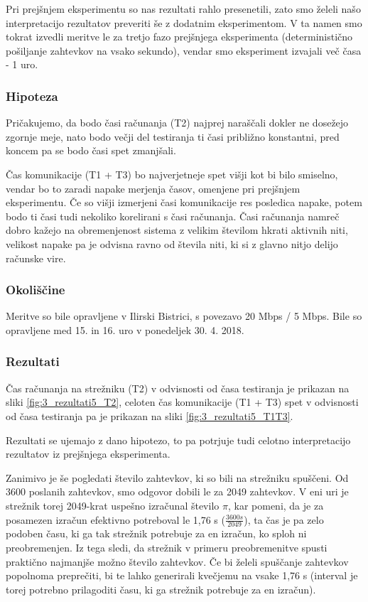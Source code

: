 Pri prejšnjem eksperimentu so nas rezultati rahlo presenetili, zato smo želeli našo interpretacijo rezultatov preveriti še z dodatnim eksperimentom.
V ta namen smo tokrat izvedli meritve le za tretjo fazo prejšnjega eksperimenta (deterministično pošiljanje zahtevkov na vsako sekundo), vendar smo eksperiment izvajali več časa - 1 uro.

\subsubsection{Hipoteza}

Pričakujemo, da bodo časi računanja (T2) najprej naraščali dokler ne dosežejo zgornje meje, nato bodo večji del testiranja ti časi približno konstantni, pred koncem pa se bodo časi spet zmanjšali.

Čas komunikacije (T1 + T3) bo najverjetneje spet višji kot bi bilo smiselno, vendar bo to zaradi napake merjenja časov, omenjene pri prejšnjem eksperimentu.
Če so višji izmerjeni časi komunikacije res posledica napake, potem bodo ti časi tudi nekoliko korelirani s časi računanja.
Časi računanja namreč dobro kažejo na obremenjenost sistema z velikim številom hkrati aktivnih niti, velikost napake pa je odvisna ravno od števila niti, ki si z glavno nitjo delijo računske vire.

\subsubsection{Okoliščine}

Meritve so bile opravljene v Ilirski Bistrici, s povezavo 20 Mbps / 5 Mbps.
Bile so opravljene med 15. in 16. uro v ponedeljek 30. 4. 2018.

\subsubsection{Rezultati}

Čas računanja na strežniku (T2) v odvisnosti od časa testiranja je prikazan na sliki \ref{fig:3_rezultati5_T2}, celoten čas komunikacije (T1 + T3) spet v odvisnosti od časa testiranja pa je prikazan na sliki \ref{fig:3_rezultati5_T1T3}.

Rezultati se ujemajo z dano hipotezo, to pa potrjuje tudi celotno interpretacijo rezultatov iz prejšnjega eksperimenta.

Zanimivo je še pogledati število zahtevkov, ki so bili na strežniku spuščeni.
Od 3600 poslanih zahtevkov, smo odgovor dobili le za 2049 zahtevkov.
V eni uri je strežnik torej 2049-krat uspešno izračunal število \(\pi\), kar pomeni, da je za posamezen izračun efektivno potreboval le 1,76 s (\(\frac{3600 s}{2049}\)), ta čas je pa zelo podoben času, ki ga tak strežnik potrebuje za en izračun, ko sploh ni preobremenjen.
Iz tega sledi, da strežnik v primeru preobremenitve spusti praktično najmanjše možno število zahtevkov.
Če bi želeli spuščanje zahtevkov popolnoma preprečiti, bi te lahko generirali kvečjemu na vsake 1,76 s (interval je torej potrebno prilagoditi času, ki ga strežnik potrebuje za en izračun).

